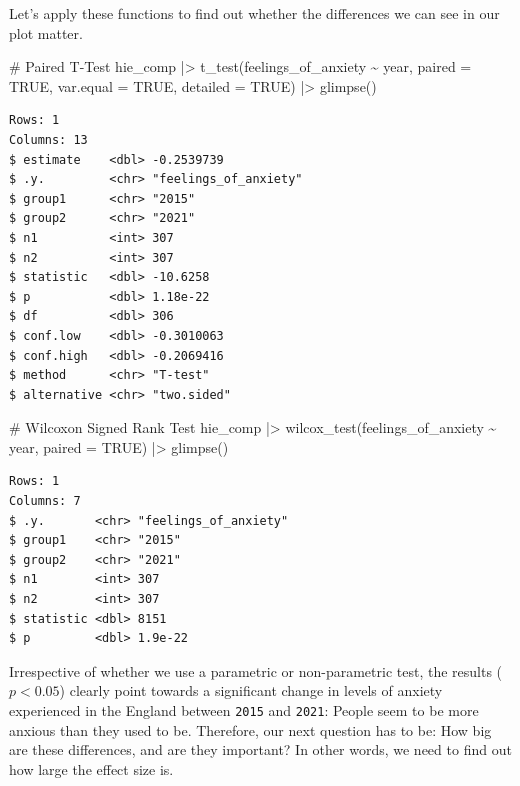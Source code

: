 \documentclass[
  letterpaper,
]{krantz}
\makeatletter
\newenvironment{Shaded}{\begin{snugshade}}{\end{snugshade}}
\newcommand{\AttributeTok}[1]{\textcolor[rgb]{0.40,0.45,0.13}{#1}}
\newcommand{\CommentTok}[1]{\textcolor[rgb]{0.37,0.37,0.37}{#1}}
\newcommand{\ConstantTok}[1]{\textcolor[rgb]{0.56,0.35,0.01}{#1}}
\newcommand{\FunctionTok}[1]{\textcolor[rgb]{0.28,0.35,0.67}{#1}}
\newcommand{\NormalTok}[1]{\textcolor[rgb]{0.00,0.23,0.31}{#1}}
\newcommand{\SpecialCharTok}[1]{\textcolor[rgb]{0.37,0.37,0.37}{#1}}
\newenvironment{kframe}{%
\medskip{}
\setlength{\fboxsep}{.8em}
 \def\at@end@of@kframe{}%
 \ifinner\ifhmode%
  \def\at@end@of@kframe{\end{minipage}}%
  \begin{minipage}{\columnwidth}%
 \fi\fi%
 \def\FrameCommand##1{\hskip\@totalleftmargin \hskip-\fboxsep
 \colorbox{shadecolor}{##1}\hskip-\fboxsep
     \hskip-\linewidth \hskip-\@totalleftmargin \hskip\columnwidth}%
 \MakeFramed {\advance\hsize-\width
   \@totalleftmargin\z@ \linewidth\hsize
   \@setminipage}}%
 {\par\unskip\endMakeFramed%
 \at@end@of@kframe}
\renewenvironment{Shaded}{\begin{kframe}}{\end{kframe}}
\makeatother
\begin{document}
Let's apply these functions to find out whether the differences we can
see in our plot matter.

\begin{Shaded}
\begin{Highlighting}[]
\CommentTok{\# Paired T{-}Test}
\NormalTok{hie\_comp }\SpecialCharTok{|\textgreater{}}
  \FunctionTok{t\_test}\NormalTok{(feelings\_of\_anxiety }\SpecialCharTok{\textasciitilde{}}\NormalTok{ year,}
         \AttributeTok{paired =} \ConstantTok{TRUE}\NormalTok{,}
         \AttributeTok{var.equal =} \ConstantTok{TRUE}\NormalTok{,}
         \AttributeTok{detailed =} \ConstantTok{TRUE}\NormalTok{) }\SpecialCharTok{|\textgreater{}}
  \FunctionTok{glimpse}\NormalTok{()}
\end{Highlighting}
\end{Shaded}

\begin{verbatim}
Rows: 1
Columns: 13
$ estimate    <dbl> -0.2539739
$ .y.         <chr> "feelings_of_anxiety"
$ group1      <chr> "2015"
$ group2      <chr> "2021"
$ n1          <int> 307
$ n2          <int> 307
$ statistic   <dbl> -10.6258
$ p           <dbl> 1.18e-22
$ df          <dbl> 306
$ conf.low    <dbl> -0.3010063
$ conf.high   <dbl> -0.2069416
$ method      <chr> "T-test"
$ alternative <chr> "two.sided"
\end{verbatim}

\begin{Shaded}
\begin{Highlighting}[]
\CommentTok{\# Wilcoxon Signed Rank Test}
\NormalTok{hie\_comp }\SpecialCharTok{|\textgreater{}}
  \FunctionTok{wilcox\_test}\NormalTok{(feelings\_of\_anxiety }\SpecialCharTok{\textasciitilde{}}\NormalTok{ year,}
              \AttributeTok{paired =} \ConstantTok{TRUE}\NormalTok{) }\SpecialCharTok{|\textgreater{}}
  \FunctionTok{glimpse}\NormalTok{()}
\end{Highlighting}
\end{Shaded}

\begin{verbatim}
Rows: 1
Columns: 7
$ .y.       <chr> "feelings_of_anxiety"
$ group1    <chr> "2015"
$ group2    <chr> "2021"
$ n1        <int> 307
$ n2        <int> 307
$ statistic <dbl> 8151
$ p         <dbl> 1.9e-22
\end{verbatim}

Irrespective of whether we use a parametric or non-parametric test, the
results (\(p < 0.05\)) clearly point towards a significant change in
levels of anxiety experienced in the England between \texttt{2015} and
\texttt{2021}: People seem to be more anxious than they used to be.
Therefore, our next question has to be: How big are these differences,
and are they important? In other words, we need to find out how large
the effect size is.
\end{document}
